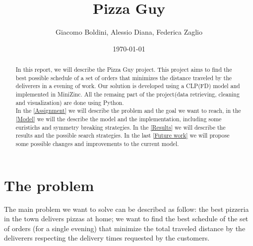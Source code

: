 \documentclass[10pt]{article}
\title{Pizza Guy}
\date{\today}
\author{Giacomo Boldini, Alessio Diana, Federica Zaglio}
\begin{document}
	\maketitle

	\begin{abstract}

		In this report, we will describe the Pizza Guy project. This project 
		aims to find the best possible schedule of a set of orders that
		minimizes the distance traveled by the deliverers in a evening of 
		work. Our solution is developed using a CLP(FD) model and implemented 
		in MiniZinc. All the remaing part of the project(data retrieving, cleaning
		and visualization) are done using Python.\\	
		In the \cref{Assignment} we will describe the problem and the goal
		we want to reach, in the \cref{Model} we will the describe the 
		model and the implementation, including some euristichs and symmetry breaking
		strategies. In the \cref{Results} we will describe the results and
		the possible search strategies. In the last \cref{Future work} we 
		will propose some possible changes and improvements to the current model.
		
	\end{abstract}

	{
\small
	\tableofcontents

	}

	\pagebreak

	\section{The problem}
	\label{Assignment}
	The main problem we want to solve can be described as follow: the best pizzeria in the 
	town delivers pizzas at home; we want to find the best schedule of the set of orders 
	(for a single evening) that minimize the total traveled distance by the deliverers 
	respecting the delivery times requested by the customers.
	
\end{document}
